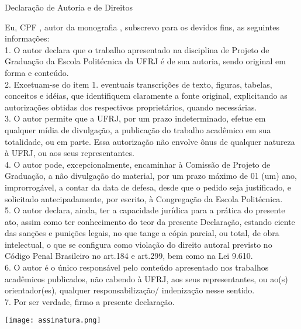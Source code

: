 \begin{center}
	Declaração de Autoria e de Direitos
\end{center}

\vspace{0.5cm}

Eu, \emph{\myName} CPF \emph{\myCpf}, autor da monografia \emph{\documentTitle}, subscrevo para os devidos fins, as seguintes informações:\\
1. O autor declara que o trabalho apresentado na disciplina de Projeto de Graduação da Escola Politécnica da UFRJ é de sua autoria, sendo original em forma e conteúdo.\\
2. Excetuam-se do item 1. eventuais transcrições de texto, figuras, tabelas, conceitos e idéias, que identifiquem claramente a fonte original, explicitando as autorizações obtidas dos respectivos proprietários, quando necessárias.\\
3. O autor permite que a UFRJ, por um prazo indeterminado, efetue em qualquer mídia de divulgação, a publicação do trabalho acadêmico em sua totalidade, ou em parte. Essa autorização não envolve ônus de qualquer natureza à UFRJ, ou aos seus representantes.\\
4. O autor pode, excepcionalmente, encaminhar à Comissão de Projeto de Graduação, a não divulgação do material, por um prazo máximo de 01 (um) ano, improrrogável, a contar da data de defesa, desde que o pedido seja justificado, e solicitado antecipadamente, por escrito, à Congregação da Escola Politécnica.\\
5. O autor declara, ainda, ter a capacidade jurídica para a prática do presente ato, assim como ter conhecimento do teor da presente Declaração, estando ciente das sanções e punições legais, no que tange a cópia parcial, ou total, de obra intelectual, o que se configura como violação do direito autoral previsto no Código Penal Brasileiro no art.184 e art.299, bem como na Lei 9.610.\\
6. O autor é o único responsável pelo conteúdo apresentado nos trabalhos acadêmicos publicados, não cabendo à UFRJ, aos seus representantes,  ou ao(s) orientador(es), qualquer responsabilização/ indenização nesse sentido.\\
7. Por ser verdade, firmo a presente declaração.\\

\vspace{0.5cm}
\begin{flushright}
    \parbox{10cm}{
        \centering
        \vspace{-1cm} %
        \texttt{[image: assinatura.png]} \\ %
        \vspace{-0.8cm} %
        \hrulefill

        \vspace{-0.375cm} %
        \centering{\myName}
		\vspace{0.1cm}
		}
\end{flushright}


